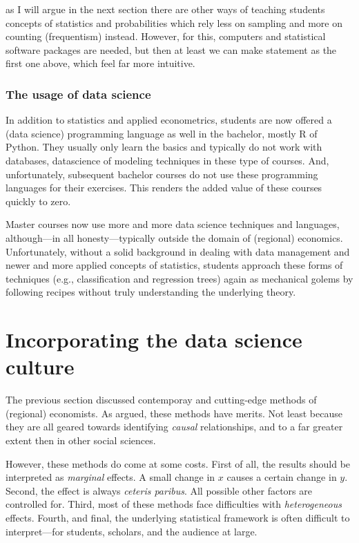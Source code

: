 \documentclass[fleqn,10pt]{SelfArx} %
\begin{document}
as I will argue in the next section there are other ways of teaching students
concepts of statistics and probabilities which rely less on sampling and more on
counting (frequentism) instead. However, for this, computers and statistical
software packages are needed, but then at least we can make statement as the
first one above, which feel far more intuitive. 

\subsubsection{The usage of data science}

In addition to statistics and applied econometrics, students are now offered a
(data science) programming language as well in the
bachelor, mostly R of Python. They usually only learn the basics and typically
do not work with databases, datascience of modeling techniques in these type of
courses. And, unfortunately, subsequent bachelor courses do not use these programming
languages for their exercises. This renders the added value of these courses
quickly to zero.

Master courses now use more and more data science techniques and languages,
although---in all honesty---typically outside the domain of (regional)
economics. Unfortunately, without a solid background in dealing with data
management and newer and more applied concepts of statistics, students approach these forms of
techniques (e.g., classification and regression trees) again as mechanical
golems by following recipes without truly understanding the underlying theory.   


\section{Incorporating the data science culture\label{agenda}}

The previous section discussed contemporay and cutting-edge methods of (regional)
economists. As argued, these methods have merits. Not least because they are all
geared towards identifying \emph{causal} relationships, and to a far greater
extent then in other social sciences.

However, these methods do come at some costs. First of all, the results should
be interpreted as \emph{marginal} effects. A small change in $x$ causes a
certain change in $y$. Second, the effect is always \emph{ceteris paribus}.
All possible other factors are controlled for. Third, most of these methods face
difficulties with \emph{heterogeneous} effects. Fourth, and final, the underlying
statistical framework is often difficult to interpret---for students, scholars,
and the audience at large.
\end{document}
